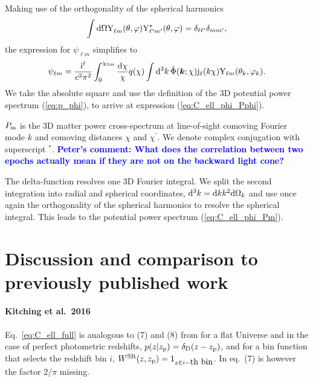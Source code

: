 \documentclass[fleqn,usenatbib]{mnras} %
\renewcommand{\vec}{\bm}
\newcommand{\mk}[1]{{\bf\textcolor{blue}{#1}}}
\begin{document}
\begin{appendix}
Making use of the orthogonality of the spherical harmonics
%
%
\begin{equation}
  \int {\rm d} \Omega {\rm Y}^{}_{\ell m}(\theta, \varphi) {\rm Y}^\ast_{\ell^\prime m^\prime}(\theta, \varphi) = \delta_{\ell \ell^\prime} \delta_{m m^\prime},
  \label{eq:Yellm_ortho}
\end{equation}
%
the expression for $\psi_{\ell m}$ simplifies to
%
\begin{equation}
  \psi_{\ell m} = \frac {{\rm i}^\ell}{c^2 \pi^2} \int_0^{\chi_{\rm lim}} \frac{{\rm d}\chi}{\chi} q(\chi) \int {\rm d}^3 k \,
    \hat \Phi(\vec k; \chi) {\rm j}_\ell(k \chi) {\rm Y}_{\ell m}(\theta_k, \varphi_k).
  \label{eq:psi_ellm}
\end{equation}
%
We take the absolute square and use the definition of the 3D potential power spectrum (\ref{eq:p_phi}),
to arrive at expression (\ref{eq:C_ell_phi_Pphi}).

$P_{\rm m}$ is the 3D matter power cross-spectrum at line-of-sight comoving
Fourier mode $k$ and comoving distances $\chi$ and $\chi^\prime$. We denote
complex conjugation with superscript $^\ast$.
\mk{Peter's comment: What does the correlation between two epochs actually mean if they
are not on the backward light cone?}

The delta-function resolves one 3D Fourier
integral. We split the second integration into radial and spherical
coordinates, ${\rm d}^3 k = {\rm d} k k^2 {\rm d} \Omega_k$ and use once again
the orthogonality of the spherical harmonics to resolve the spherical integral. 
This leads to the potential power spectrum (\ref{eq:C_ell_phi_Pm}).




\section{Discussion and comparison to previously published work}

\paragraph{Kitching et al.~2016}

Eq.~\ref{eq:C_ell_full} is analogous to (7) and (8) from
\cite{2016arXiv161104954K} for a flat Universe and in the case of perfect
photometric redshifts, $p(z | z_{\rm p}) = \delta_{\rm D}(z - z_{\rm p})$, and
for a bin function that selects the redshift bin $i$, $W^{\rm SR}(z, z_{\rm p})
= 1_{z \in i-\mbox{th bin}}$. In \cite{2016arXiv161104954K} eq.~(7) is however the
factor $2/\pi$ missing.


\end{appendix}
\end{document}
